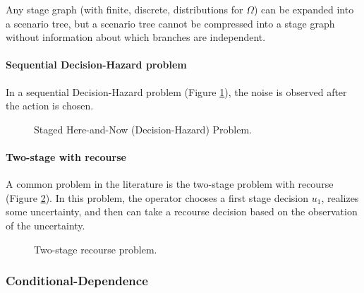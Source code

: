 \documentclass[final,1p,times]{elsarticle}
\newcommand{\drawHDsquiggle}[1]{\draw[-stealth, decoration={snake, amplitude = .4mm, segment length = 1.5mm, post length=0.9mm},decorate] (#1)+(-0.75, 0.5) -- (#1);}
\newcommand{\drawDHsquiggle}[1]{\draw[-stealth, decoration={snake, amplitude = .4mm, segment length = 1.5mm, post length=0.9mm},decorate] (#1)+(0.75, 0.5) -- (#1);}
\begin{document}
Any stage graph (with finite, discrete, distributions for $\Omega$) can be expanded into a scenario tree, but a scenario tree cannot be compressed into a stage graph without information about which branches are independent.

\paragraph{Sequential Decision-Hazard problem}

In a sequential Decision-Hazard problem (Figure \ref{fig:sdh}), the noise is observed after the action is chosen. 

\begin{figure}[!ht]
    \centering
{}
\caption{Staged Here-and-Now (Decision-Hazard) Problem.}
\label{fig:sdh}
\end{figure}

\paragraph{Two-stage with recourse}

A common problem in the literature is the two-stage problem with recourse (Figure \ref{fig:2stage}). In this problem, the operator chooses a first stage decision $u_1$, realizes some uncertainty, and then can take a recourse decision based on the observation of the uncertainty.

\begin{figure}[!ht]
    \centering
{}
\caption{Two-stage recourse problem.}
\label{fig:2stage}
\end{figure}

\subsubsection{Conditional-Dependence}\label{sec:conditional}
\end{document}
